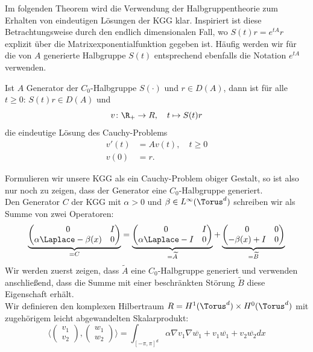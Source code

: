 Im folgenden Theorem wird die Verwendung der Halbgruppentheorie zum Erhalten von eindeutigen Lösungen der KGG klar. Inspiriert ist diese Betrachtungsweise durch den endlich dimensionalen Fall, wo $S(t)r=e^{tA}r$ explizit über die Matrixexponentialfunktion gegeben ist. Häufig werden wir für die von $A$ generierte Halbgruppe $S(t)$ entsprechend ebenfalls die Notation $e^{tA}$ verwenden.
\begin{maththeorem}
Ist $A$ Generator der $C_0$-Halbgruppe $S(\cdot)$ und $r\in D(A)$, dann ist für alle $t\ge 0\colon \,S(t)r\in D(A)$ und
\[v\colon \R_+\to R,\quad t\mapsto S(t)r\]
die eindeutige Lösung des Cauchy-Problems
\begin{equation}
\begin{split}
v'(t)&=Av(t),\quad t\ge 0\\
v(0)&=r.
\end{split}
\end{equation}
\end{maththeorem}
Formulieren wir unsere KGG als ein Cauchy-Problem obiger Gestalt, so ist also nur noch zu zeigen, dass der Generator eine $C_0$-Halbgruppe generiert.\\
Den Generator $C$ der KGG mit $\alpha>0$ und $\beta\in L^\infty(\Torus^d)$ schreiben wir als Summe von zwei Operatoren:
\[\underbrace{\begin{pmatrix}0 & I\\ \alpha\Laplace -\beta(x) & 0\end{pmatrix}}_{=C}
=\underbrace{\begin{pmatrix}0 & I\\ \alpha\Laplace-I & 0\end{pmatrix}}_{=\widetilde{A}}
+\underbrace{\begin{pmatrix}0 & 0\\ -\beta(x)+I & 0\end{pmatrix}}_{=\widetilde{B}}\]
Wir werden zuerst zeigen, dass $\widetilde{A}$ eine $C_0$-Halbgruppe generiert und verwenden anschließend, dass die Summe mit einer beschränkten Störung $\widetilde{B}$ diese Eigenschaft erhält.\\[0.2cm]
Wir definieren den komplexen Hilbertraum $R=H^1(\Torus^d)\times H^0(\Torus^d)$ mit zugehörigem leicht abgewandelten Skalarprodukt:
\[\langle \begin{pmatrix}v_1\\v_2\end{pmatrix}, \begin{pmatrix}w_1\\w_2\end{pmatrix}\rangle =\int_{[-\pi,\pi]^d}\alpha \nabla v_1\nabla \overline{w_1}+v_1\overline{w_1}+ v_2\overline{w_2}dx\]
